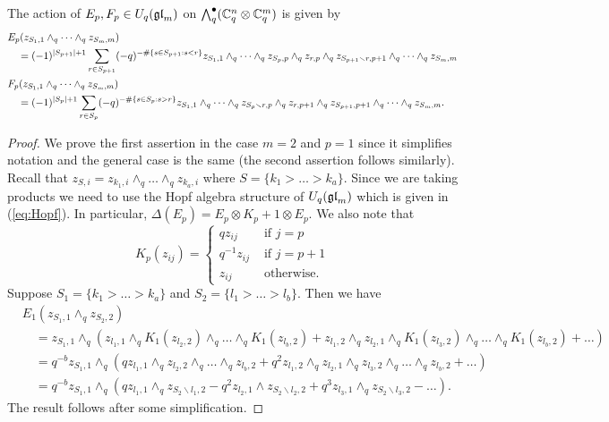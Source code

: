 \documentclass[11pt]{amsart}
\begin{document}
\begin{lem} \label{lem:Eaction}
The action of $E_p,F_p \in U_q({\mathfrak{gl}}_m)$ on ${\textstyle\bigwedge^{\bullet}_{q}} ({\mathbb{C}}_q^n \otimes {\mathbb{C}}_q^m)$ is given by
\begin{align*}
& E_p (z_{S_1,1} \wedge_q \cdots \wedge_q z_{S_m,m})  \\
&\quad= (-1)^{|S_{p+1}|+1} \sum_{r \in S_{p+1}} (-q)^{- \# \{s \in S_{p+1}: s < r \}} z_{S_1,1} \wedge_q \cdots \wedge_q z_{S_p,p} \wedge_q z_{r,p} \wedge_q z_{S_{p+1} \smallsetminus r,p+1} \wedge_q \cdots \wedge_q z_{S_m,m} \notag \\
& F_p (z_{S_1,1} \wedge_q \cdots \wedge_q z_{S_m,m}) \\
&\quad=(-1)^{|S_p|+1} \sum_{r \in S_p} (-q)^{- \#\{s \in S_p: s > r \}} z_{S_1,1} \wedge_q \cdots \wedge_q z_{S_p \smallsetminus r,p} \wedge_q z_{r,p+1} \wedge_q z_{S_{p+1},p+1} \wedge_q \cdots \wedge_q z_{S_m,m}. \notag
\end{align*}
\end{lem}
\begin{proof}
We prove the first assertion in the case $m=2$ and $p=1$ since it simplifies notation and the general case is the same (the second assertion follows similarly). Recall that $z_{S,i} = z_{k_1,i} \wedge_q \dots \wedge_q z_{k_a,i}$ where $S = \{k_1 > \dots > k_a\}$. Since we are taking products we need to use the Hopf algebra structure of $U_q({\mathfrak{gl}}_m)$ which is given in (\ref{eq:Hopf}). In particular, $\Delta(E_p) = E_p \otimes K_p + 1 \otimes E_p$. We also note that
$$K_p(z_{ij}) =
\begin{cases}
q z_{ij} & \text{ if } j=p \\
q^{-1} z_{ij} & \text{ if } j=p+1 \\
z_{ij} & \text{ otherwise.}
\end{cases}$$
Suppose $S_1 = \{k_1 > \dots > k_a\}$ and $S_2 = \{l_1 > \dots > l_b\}$. Then we have
\begin{align*}
& E_1(z_{S_1,1} \wedge_q z_{S_2,2}) \\
&\quad= z_{S_1,1} \wedge_q ( z_{l_1,1} \wedge_q K_1(z_{l_2,2}) \wedge_q \dots \wedge_q K_1(z_{l_b,2}) + z_{l_1,2} \wedge_q z_{l_2,1} \wedge_q K_1(z_{l_3,2}) \wedge_q \dots \wedge_q K_1(z_{l_b,2}) + \dots ) \\
&\quad= q^{-b} z_{S_1,1} \wedge_q ( q z_{l_1,1} \wedge_q z_{l_2,2} \wedge_q \dots \wedge_q z_{l_b,2} + q^2 z_{l_1,2} \wedge_q z_{l_2,1} \wedge_q z_{l_3,2} \wedge_q \dots \wedge_q z_{l_b,2} + \dots) \\
&\quad= q^{-b} z_{S_1,1} \wedge_q (q z_{l_1,1} \wedge_q z_{S_2 \smallsetminus l_1,2} - q^2 z_{l_2,1} \wedge z_{S_2 \smallsetminus l_2,2} + q^3 z_{l_3,1} \wedge_q z_{S_2 \smallsetminus l_3,2} - \dots ).
\end{align*}
The result follows after some simplification.
\end{proof}
\end{document}
